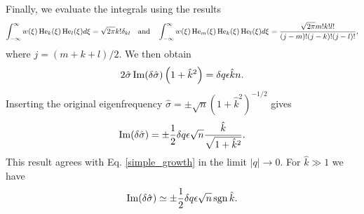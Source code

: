 Finally, we evaluate the integrals using the results
\begin{align}
  \int_{-\infty}^{\infty}
  w(\xi) \operatorname{He}_k(\xi)\operatorname{He}_l(\xi) d\xi = \sqrt{2\pi}k!\delta_{kl} \quad
\text{and} \quad
  \int_{-\infty}^{\infty}
  w(\xi) \operatorname{He}_m(\xi)\operatorname{He}_k(\xi)\operatorname{He}_l(\xi) d\xi =
  \frac{\sqrt{2\pi}m!k!l!}{(j-m)!(j-k)!(j-l)!}, 
\end{align}
where $j = (m+k+l)/2$. We then obtain
 \begin{align}
   2\hat{\sigma}\operatorname{Im}(\delta\hat{\sigma})
  \left(1+\hat{k}^2\right) = \delta q \epsilon \hat{k} n.
 \end{align}
Inserting the original eigenfrequency $\hat{\sigma} = \pm
\sqrt{n}(1+\hat{k}^2)^{-1/2}$ gives
\begin{align}
  \operatorname{Im}(\delta\hat{\sigma})= \pm \frac{1}{2}\delta q \epsilon
  \sqrt{n} \frac{\hat{k}}{\sqrt{1+\hat{k}^2}}. 
\end{align}
This result agrees with Eq. \ref{simple_growth} in the limit
$|q|\to0$. 
For $\hat{k}\gg 1$ we have
\begin{align}
  \operatorname{Im}(\delta\hat{\sigma})\simeq \pm \frac{1}{2}\delta q \epsilon
  \sqrt{n} \operatorname{sgn}{\hat{k}}. 
\end{align}




